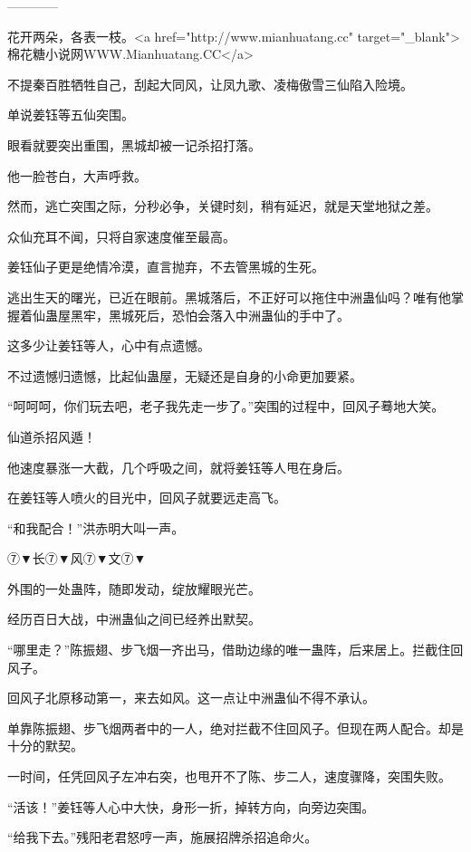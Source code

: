 
\begin{this_body}

------------

花开两朵，各表一枝。<a href="http://www.mianhuatang.cc" target="\_blank">棉花糖小说网WWW.Mianhuatang.CC</a>

不提秦百胜牺牲自己，刮起大同风，让凤九歌、凌梅傲雪三仙陷入险境。

单说姜钰等五仙突围。

眼看就要突出重围，黑城却被一记杀招打落。

他一脸苍白，大声呼救。

然而，逃亡突围之际，分秒必争，关键时刻，稍有延迟，就是天堂地狱之差。

众仙充耳不闻，只将自家速度催至最高。

姜钰仙子更是绝情冷漠，直言抛弃，不去管黑城的生死。

逃出生天的曙光，已近在眼前。黑城落后，不正好可以拖住中洲蛊仙吗？唯有他掌握着仙蛊屋黑牢，黑城死后，恐怕会落入中洲蛊仙的手中了。

这多少让姜钰等人，心中有点遗憾。

不过遗憾归遗憾，比起仙蛊屋，无疑还是自身的小命更加要紧。

“呵呵呵，你们玩去吧，老子我先走一步了。”突围的过程中，回风子蓦地大笑。

仙道杀招风遁！

他速度暴涨一大截，几个呼吸之间，就将姜钰等人甩在身后。

在姜钰等人喷火的目光中，回风子就要远走高飞。

“和我配合！”洪赤明大叫一声。

⑦▼长⑦▼风⑦▼文⑦▼

外围的一处蛊阵，随即发动，绽放耀眼光芒。

经历百日大战，中洲蛊仙之间已经养出默契。

“哪里走？”陈振翅、步飞烟一齐出马，借助边缘的唯一蛊阵，后来居上。拦截住回风子。

回风子北原移动第一，来去如风。这一点让中洲蛊仙不得不承认。

单靠陈振翅、步飞烟两者中的一人，绝对拦截不住回风子。但现在两人配合。却是十分的默契。

一时间，任凭回风子左冲右突，也甩开不了陈、步二人，速度骤降，突围失败。

“活该！”姜钰等人心中大快，身形一折，掉转方向，向旁边突围。

“给我下去。”残阳老君怒哼一声，施展招牌杀招追命火。


\end{this_body}
